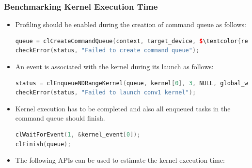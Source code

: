 \subsubsection*{Benchmarking Kernel Execution Time}
\begin{itemize}
\item Profiling should be enabled during the creation of command queue as follows:\\
\begin{minipage}{\textwidth}
\begin{center}
\begin{lstlisting}[columns=fullflexible, language=C++, escapechar = \$, backgroundcolor=\color{gray!10}, basicstyle = \small]
queue = clCreateCommandQueue(context, target_device, $\textcolor{red}{CL\_QUEUE\_PROFILING\_ENABLE}$, &status); 
checkError(status, "Failed to create command queue");
\end{lstlisting}
\end{center}
\end{minipage}
\item An event is associated with the kernel during its launch as follows:\\
\begin{minipage}{\textwidth}
\begin{center}
\begin{lstlisting}[columns=fullflexible, language=C++, escapechar = \$, backgroundcolor=\color{gray!10}, basicstyle = \small]
status = clEnqueueNDRangeKernel(queue, kernel[0], 3, NULL, global_work_size, NULL, 0, NULL, $\textcolor{red}{\&kernel\_event[0]}$);
checkError(status, "Failed to launch conv1 kernel");
\end{lstlisting}
\end{center}
\end{minipage}
\item Kernel execution has to be completed and also all enqueued tasks in the command queue should finish.\\
\begin{minipage}{\textwidth}
\begin{center}
\begin{lstlisting}[columns=fullflexible, language=C++, escapechar = \$, backgroundcolor=\color{gray!10}, basicstyle = \small]
clWaitForEvent(1, &kernel_event[0]);
clFinish(queue);
\end{lstlisting}
\end{center}
\end{minipage}
\item The following APIs can be used to estimate the kernel execution time:\\

\end{itemize}
